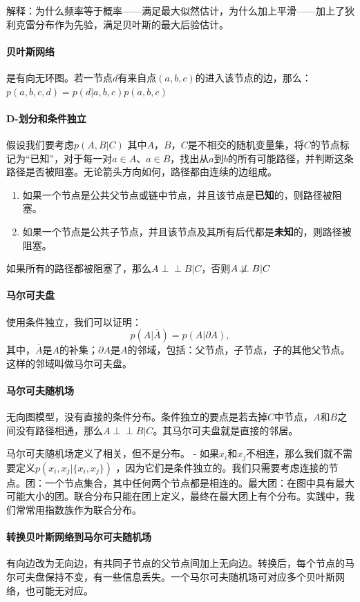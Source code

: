 解释：为什么频率等于概率——满足最大似然估计，为什么加上平滑——加上了狄利克雷分布作为先验，满足贝叶斯的最大后验估计。

\paragraph{贝叶斯网络} 是有向无环图。若一节点$d$有来自点$(a,b,c)$的进入该节点的边，那么：
$p(a,b,c,d) = p(d|a,b,c)p(a,b,c)$

\paragraph{D-划分和条件独立}
假设我们要考虑$p(A,B|C)$ 其中$A$，$B$，$C$是不相交的随机变量集，将$C$的节点标记为“已知”，对于每一对$a \in A$、$a \in B$，找出从$a$到$b$的所有可能路径，并判断这条路径是否被阻塞。无论箭头方向如何，路径都由连续的边组成。
\begin{enumerate}
\item 如果一个节点是公共父节点或链中节点，并且该节点是\textbf{已知}的，则路径被阻塞。
\item 如果一个节点是公共子节点，并且该节点及其所有后代都是\textbf{未知}的，则路径被阻塞。
\end{enumerate}
如果所有的路径都被阻塞了，那么$A \perp \!\!\! \perp B | C$，否则$A \not \! \perp \!\!\! \perp B | C$

\paragraph{马尔可夫盘}
使用条件独立，我们可以证明：$$p(A|\bar{A}) = p(A|\partial A),$$其中，$\bar{A}$是$A$的补集；$\partial A$是$A$的邻域，包括：父节点，子节点，子的其他父节点。这样的邻域叫做马尔可夫盘。

\paragraph{马尔可夫随机场} 无向图模型，没有直接的条件分布。条件独立的要点是若去掉$C$中节点，$A$和$B$之间没有路径相通，那么$A \perp \!\!\! \perp B | C$。其马尔可夫盘就是直接的邻居。

马尔可夫随机场定义了相关，但不是分布。
- 如果$x_i$和$x_j$不相连，那么我们就不需要定义$p(x_i, x_j |\{x_i , x_j\})$ ，因为它们是条件独立的。我们只需要考虑连接的节点。团：一个节点集合，其中任何两个节点都是相连的。最大团：在图中具有最大可能大小的团。联合分布只能在团上定义，最终在最大团上有个分布。实践中，我们常常用指数族作为联合分布。

\paragraph{转换贝叶斯网络到马尔可夫随机场}
有向边改为无向边，有共同子节点的父节点间加上无向边。转换后，每个节点的马尔可夫盘保持不变，有一些信息丢失。一个马尔可夫随机场可对应多个贝叶斯网络，也可能无对应。

